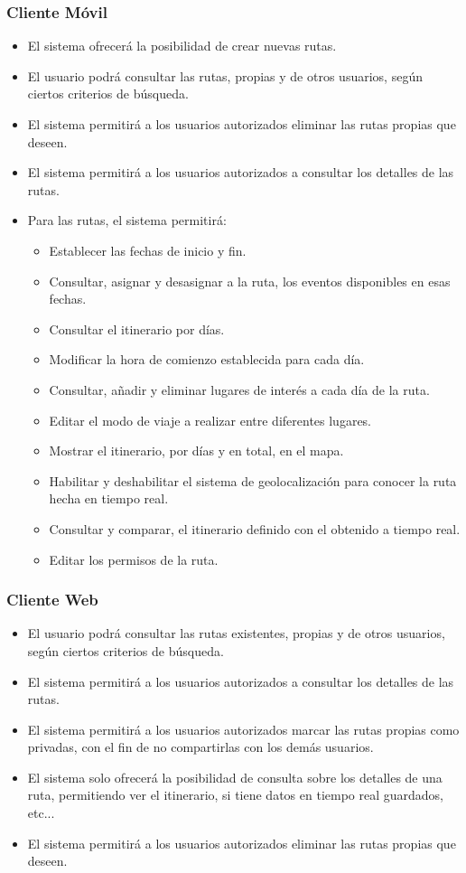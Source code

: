 \subsubsection*{Cliente Móvil}
\begin{itemize}
\setlength\itemsep{1pt}
\item El sistema ofrecerá la posibilidad de crear nuevas rutas.
\item El usuario podrá consultar las rutas, propias y de otros usuarios, según ciertos criterios de búsqueda.
\item El sistema permitirá a los usuarios autorizados eliminar las rutas propias que deseen.
\item El sistema permitirá a los usuarios autorizados a consultar los detalles de las rutas.
\item Para las rutas, el sistema permitirá:
	\begin{itemize}
	\item Establecer las fechas de inicio y fin.
	\item Consultar, asignar y desasignar a la ruta, los eventos disponibles en esas fechas.
	\item Consultar el itinerario por días.
	\item Modificar la hora de comienzo establecida para cada día.
	\item Consultar, añadir y eliminar lugares de interés a cada día de la ruta.
	\item Editar el modo de viaje a realizar entre diferentes lugares.
	\item Mostrar el itinerario, por días y en total, en el mapa.
	\item Habilitar y deshabilitar el sistema de geolocalización para conocer la ruta hecha en tiempo real.
	\item Consultar y comparar, el itinerario definido con el obtenido a tiempo real.
	\item Editar los permisos de la ruta.
	\end{itemize}
\end{itemize}

\subsubsection*{Cliente Web}
\begin{itemize}
\setlength\itemsep{1pt}
\item El usuario podrá consultar las rutas existentes, propias y de otros usuarios, según ciertos criterios de búsqueda.
\item El sistema permitirá a los usuarios autorizados a consultar los detalles de las rutas.
\item El sistema permitirá a los usuarios autorizados marcar las rutas propias como privadas, con el fin de no compartirlas con los demás usuarios.
\item El sistema solo ofrecerá la posibilidad de consulta sobre los detalles de una ruta, permitiendo ver el itinerario, si tiene datos en tiempo real guardados, etc...
\item El sistema permitirá a los usuarios autorizados eliminar las rutas propias que deseen.
\end{itemize}

